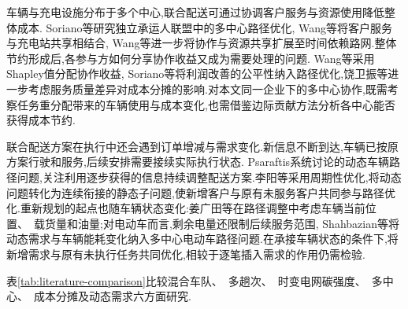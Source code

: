 \documentclass{setp-new}
\begin{document}
车辆与充电设施分布于多个中心,联合配送可通过协调客户服务与资源使用降低整体成本. Soriano等\cite{ref:8}研究独立承运人联盟中的多中心路径优化, Wang等\cite{ref:7}将客户服务与充电站共享相结合, Wang等\cite{ref:wang2024}进一步将协作与资源共享扩展至时间依赖路网.整体节约形成后,各参与方如何分享协作收益又成为需要处理的问题. Wang等\cite{ref:7}采用Shapley值分配协作收益, Soriano等\cite{ref:8}将利润改善的公平性纳入路径优化,饶卫振等\cite{ref:91}进一步考虑服务质量差异对成本分摊的影响.对本文同一企业下的多中心协作,既需考察任务重分配带来的车辆使用与成本变化,也需借鉴边际贡献方法分析各中心能否获得成本节约.

联合配送方案在执行中还会遇到订单增减与需求变化\cite{ref:18,ref:zhang2022}.新信息不断到达,车辆已按原方案行驶和服务,后续安排需要接续实际执行状态. Psaraftis\cite{ref:14}系统讨论的动态车辆路径问题,关注利用逐步获得的信息持续调整配送方案.李阳等\cite{ref:18}采用周期性优化,将动态问题转化为连续衔接的静态子问题,使新增客户与原有未服务客户共同参与路径优化.重新规划的起点也随车辆状态变化:姜广田等\cite{ref:51}在路径调整中考虑车辆当前位置、~载货量和油量;对电动车而言,剩余电量还限制后续服务范围, Shahbazian等\cite{ref:shahbazian2025}将动态需求与车辆能耗变化纳入多中心电动车路径问题.在承接车辆状态的条件下,将新增需求与原有未执行任务共同优化,相较于逐笔插入需求的作用仍需检验.

表\ref{tab:literature-comparison}比较混合车队、~多趟次、~时变电网碳强度、~多中心、~成本分摊及动态需求六方面研究.
\end{document}
